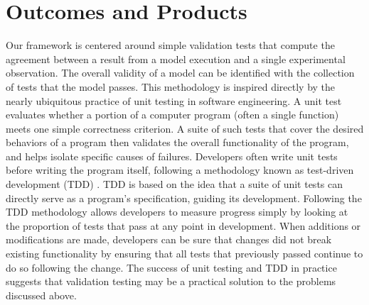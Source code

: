 \documentclass[11pt,letterpaper]{article}
\begin{document}

\section{Outcomes and Products}
Our framework is centered around simple validation tests that compute the agreement between a result from a model execution and a single experimental observation. The overall validity of a model can be identified with the collection of tests that the model passes. This methodology is inspired directly by the nearly ubiquitous practice of unit testing in software engineering. A unit test evaluates whether a portion of a computer program (often a single function) meets one simple correctness criterion. A suite of such tests that cover the desired behaviors of a program then validates the overall functionality of the program, and helps isolate specific causes of failures. Developers often write unit tests before writing the program itself, following a methodology known as test-driven development (TDD) \cite{beck2002}. TDD is based on the idea that a suite of unit tests can directly serve as a program's specification, guiding its development. Following the TDD methodology allows developers to measure progress simply by looking at the proportion of tests that pass at any point in development. When additions or modifications are made, developers can be sure that changes did not break existing functionality by ensuring that all tests that previously passed continue to do so following the change. The success of unit testing and TDD in practice suggests that validation testing may be a practical solution to the problems discussed above. 
\end{document}
